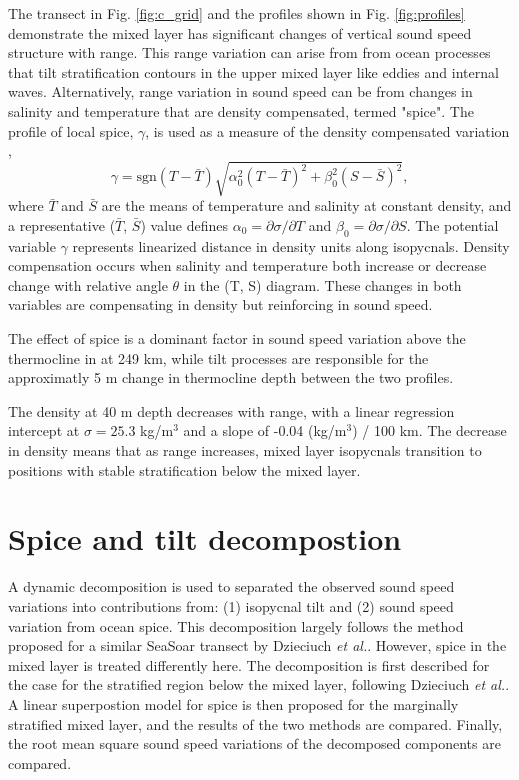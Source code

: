 \documentclass[preprint,NumberedRefs]{JASA}
\begin{document}
The transect in Fig. \ref{fig:c_grid} and the profiles shown in Fig. \ref{fig:profiles} demonstrate the mixed layer has significant changes of vertical sound speed structure with range. This range variation can arise from from ocean processes that tilt stratification contours in the upper mixed layer like eddies and internal waves. Alternatively, range variation in sound speed can be from changes in salinity and temperature that are density compensated, termed "spice". The profile of local spice, $\gamma$, is used as a measure of the density compensated variation \citep{klymak2015spice},
\begin{equation}
    \gamma=\textrm{sgn}(T-\bar{T}) \sqrt{\alpha_0^2(T-\bar{T})^2 +\beta_0^2(S-\bar{S})^2},
    \label{eq:gamma}
\end{equation}
where $\bar{T}$ and $\bar{S}$ are the means of temperature and salinity at constant density, and a representative ($\bar{T}$, $\bar{S}$) value defines $\alpha_0=\partial \sigma / \partial T$ and $\beta_0=\partial \sigma / \partial S$. The potential variable $\gamma$ represents linearized distance in density units along isopycnals. Density compensation occurs when salinity and temperature both increase or decrease change with relative angle $\theta$ in the (T, S) diagram. These changes in both variables are compensating in density but reinforcing in sound speed.

The effect of spice is a dominant factor in sound speed variation above the thermocline in at 249 km, while tilt processes are responsible for the approximatly 5 m change in thermocline depth between the two profiles.

The density at 40 m depth decreases with range, with a linear regression intercept at $\sigma=25.3$ kg/m$^3$ and a slope of -0.04 (kg/m$^3$) / 100 km. The decrease in density means that as range increases, mixed layer isopycnals transition to positions with stable stratification below the mixed layer.

\section{\label{sec:decomposition}Spice and tilt decompostion}
A dynamic decomposition is used to separated the observed sound speed variations into contributions from: (1) isopycnal tilt and (2) sound speed variation from ocean spice. This decomposition largely follows the method proposed for a similar SeaSoar transect by Dzieciuch \emph{et al.}\citep{dzieciuch2004}. However, spice in the mixed layer is treated differently here. The decomposition is first described for the case for the stratified region below the mixed layer, following Dzieciuch \emph{et al.}\citep{dzieciuch2004}. A linear superpostion model for spice is then proposed for the marginally stratified mixed layer, and the results of the two methods are compared. Finally, the root mean square sound speed variations of the decomposed components are compared.
\end{document}
